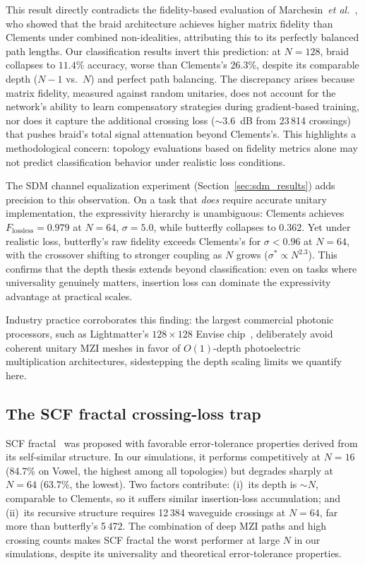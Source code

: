 \documentclass[11pt,a4paper]{article}
\begin{document}
This result directly contradicts the fidelity-based evaluation of
Marchesin~\textit{et al.}~\cite{marchesin2025}, who showed that the braid
architecture achieves higher matrix fidelity than Clements under combined
non-idealities, attributing this to its perfectly balanced path lengths.  Our
classification results invert this prediction: at $N{=}128$, braid collapses
to $11.4$\% accuracy, worse than Clements's $26.3$\%, despite its comparable
depth ($N{-}1$ vs.\ $N$) and perfect path balancing.  The discrepancy arises
because matrix fidelity, measured against random unitaries, does not account
for the network's ability to learn compensatory strategies during
gradient-based training, nor does it capture the additional crossing loss
(${\sim}3.6$~dB from 23\,814 crossings) that pushes braid's total signal
attenuation beyond Clements's.  This highlights a methodological concern:
topology evaluations based on fidelity metrics alone may not predict
classification behavior under realistic loss conditions.

The SDM channel equalization experiment (Section~\ref{sec:sdm_results})
adds precision to this observation.  On a task that \emph{does} require
accurate unitary implementation, the expressivity hierarchy is
unambiguous: Clements achieves $F_{\mathrm{lossless}} = 0.979$ at
$N{=}64$, $\sigma{=}5.0$, while butterfly collapses to $0.362$.
Yet under realistic loss, butterfly's raw fidelity exceeds Clements's
for $\sigma < 0.96$ at $N{=}64$, with the crossover shifting to stronger
coupling as $N$ grows ($\sigma^* \propto N^{2.3}$).  This confirms that
the depth thesis extends beyond classification: even on tasks where
universality genuinely matters, insertion loss can dominate the
expressivity advantage at practical scales.

Industry practice corroborates this finding: the largest commercial photonic
processors, such as Lightmatter's $128 \times 128$ Envise chip~\cite{ahmed2025},
deliberately avoid coherent unitary MZI meshes in favor of $O(1)$-depth
photoelectric multiplication architectures, sidestepping the depth scaling
limits we quantify here.

\subsection{The SCF fractal crossing-loss trap}

SCF fractal~\cite{basani2023} was proposed with favorable error-tolerance
properties derived from its self-similar structure.  In our simulations, it
performs competitively at $N{=}16$ (84.7\% on Vowel, the highest among all
topologies) but degrades sharply at $N{=}64$ (63.7\%, the lowest).  Two
factors contribute: (i)~its depth is ${\sim}N$, comparable to Clements, so it
suffers similar insertion-loss accumulation; and (ii)~its recursive structure
requires 12\,384 waveguide crossings at $N{=}64$, far more than butterfly's
5\,472.  The combination of deep MZI paths and high crossing counts makes SCF
fractal the worst performer at large $N$ in our simulations, despite its
universality and theoretical error-tolerance properties.
\end{document}
